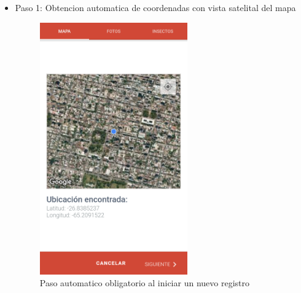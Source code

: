 \begin{itemize}
					\begin{itemize}
						\item Paso 1: Obtencion automatica de coordenadas con vista satelital del mapa
							\begin{figure}
								\centering
									\includegraphics[width=0.6\textwidth]{Screenshots/registroPaso1.png}
											\caption{Paso automatico obligatorio al iniciar un nuevo registro}
									\label{fig:registroPaso1}
							\end{figure}


\end{itemize}
\end{itemize}
